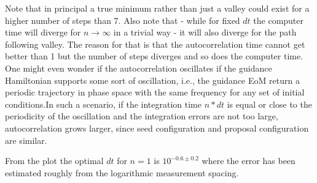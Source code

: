 \documentclass[11pt, a4paper]{scrartcl}
\begin{document}
    Note that in principal a true minimum rather than just a valley could exist for a higher number of steps than 7. Also note that - while for fixed $dt$ the computer time will diverge for $n \rightarrow \infty$ in a trivial way - it will also diverge for the path following valley. The reason for that is that the autocorrelation time cannot get better than 1 but the number of steps diverges and so does the computer time. One might even wonder if the autocorrelation oscillates if the guidance Hamiltonian supports some sort of oscillation, i.e., the guidance EoM return a periodic trajectory in phase space with the same frequency for any set of initial conditions.In such a scenario, if the integration time $n*dt$ is equal or close to the periodicity of the oscillation and the integration errors are not too large, autocorrelation grows larger, since seed configuration and proposal configuration are similar.

    From the plot the optimal $dt$ for $n = 1$ is $10^{-0.6 \pm 0.2}$ where the error has been estimated roughly from the logarithmic measurement spacing.
\end{document}
